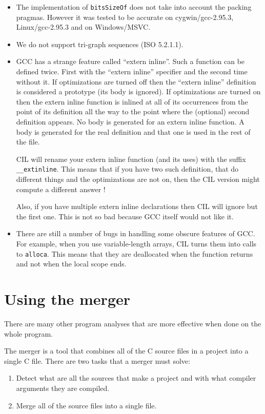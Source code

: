 \documentclass{article}
\def\t#1{{\tt #1}}
\begin{document}
\begin{itemize}

\item The implementation of \t{bitsSizeOf} does not take into account the
packing pragmas. However it was tested to be accurate on cygwin/gcc-2.95.3,
Linux/gcc-2.95.3 and on Windows/MSVC.

\item We do not support tri-graph sequences (ISO 5.2.1.1).

\item GCC has a strange feature called ``extern inline''. Such a function can
be defined twice. First with the ``extern inline'' specifier and the second
time without it. If optimizations are turned off then the ``extern inline''
definition is considered a prototype (its body is ignored). If optimizations
are turned on then the extern inline function is inlined at all of its
occurrences from the point of its definition all the way to the point where the
(optional) second definition appears. No body is generated for an extern
inline function. A body is generated for the real definition and that one is
used in the rest of the file. 

 CIL will rename your extern inline function (and its uses) with the suffix
 \t{\_\_extinline}. This means that if you have two such definition, that do
 different things and the optimizations are not on, then the CIL version might
 compute a different answer !

 Also, if you have multiple extern inline declarations then CIL will ignore
but the first one. This is not so bad because GCC itself would not like it. 

\item There are still a number of bugs in handling some obscure features of
GCC. For example, when you use variable-length arrays, CIL turns them into
calls to \t{alloca}. This means that they are deallocated when the function
returns and not when the local scope ends. 
\end{itemize}

  \section{Using the merger}\label{sec-merger}

 There are many other program analyses that are more effective when
done on the whole program.

 The merger is a tool that combines all of the C source files in a project
into a single C file. There are two tasks that a merger must solve:
\begin{enumerate}
\item Detect what are all the sources that make a project and with what
compiler arguments they are compiled.

\item Merge all of the source files into a single file. 
\end{enumerate}
\end{document}
